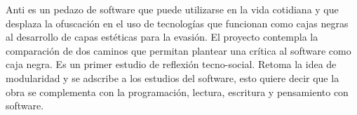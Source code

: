 Anti es un pedazo de software que puede utilizarse en la vida cotidiana y que desplaza la ofuscación en el uso de tecnologías que funcionan como cajas negras al desarrollo de capas estéticas para la evasión. El proyecto contempla la comparación de dos caminos que permitan plantear una crítica al software como caja negra. Es un primer estudio de reflexión tecno-social. Retoma la idea de modularidad y se adscribe a los estudios del software, esto quiere decir que la obra se complementa con la programación, lectura, escritura y pensamiento con software.



